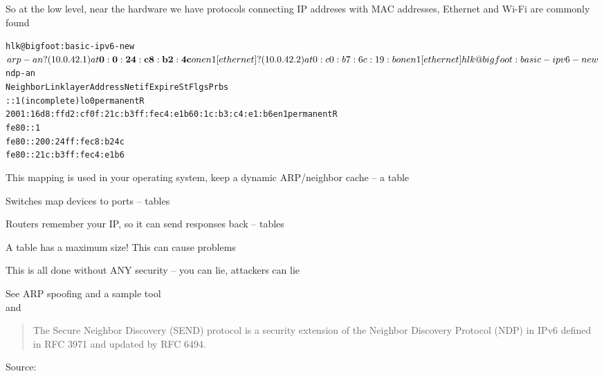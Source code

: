 \documentclass[Screen16to9,17pt]{foils}
\newcommand{\myalert}{\color{red}\faFlag}
\begin{document}

So at the low level, near the hardware we have protocols connecting IP addreses with MAC addresses, Ethernet and Wi-Fi are commonly found

\begin{alltt}
\small
hlk@bigfoot:basic-ipv6-new$ arp -an
? (10.0.42.1) at{\bf 0:0:24:c8:b2:4c} on en1 [ethernet]
? (10.0.42.2) at 0:c0:b7:6c:19:b on en1 [ethernet]

hlk@bigfoot:basic-ipv6-new$ ndp -an
Neighbor                      Linklayer Address  Netif Expire    St Flgs Prbs
::1                           (incomplete)         lo0 permanent R
2001:16d8:ffd2:cf0f:21c:b3ff:fec4:e1b6 0:1c:b3:c4:e1:b6 en1 permanent R
fe80::1%lo0                   (incomplete)         lo0 permanent R
fe80::200:24ff:fec8:b24c%en1 {\bf 0:0:24:c8:b2:4c}      en1 8h54m51s  S  R
fe80::21c:b3ff:fec4:e1b6%en1  0:1c:b3:c4:e1:b6     en1 permanent R
\end{alltt}


\begin{list2}
\item This mapping is used in your operating system, keep a dynamic ARP/neighbor cache -- a table
\item Switches map devices to ports -- tables
\item Routers remember your IP, so it can send responses back -- tables
\item A table has a maximum size! This can cause problems {\myalert}
\item This is all done without ANY security -- you can lie, attackers can lie
\item See ARP spoofing and a sample tool  \\
and 
\end{list2}




\begin{quote}
The Secure Neighbor Discovery (SEND) protocol is a security extension of the Neighbor Discovery Protocol (NDP) in IPv6 defined in RFC 3971 and updated by RFC 6494.
\end{quote}
Source: 
\end{document}
